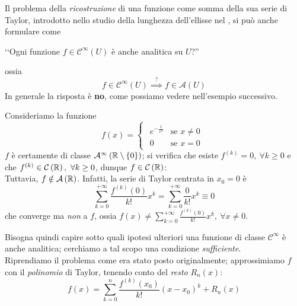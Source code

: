 Il problema della \textit{ricostruzione} di una funzione come somma della sua serie di Taylor, introdotto nello studio della lunghezza dell'ellisse nel , si può anche formulare come
\begin{center}
	‘‘Ogni funzione $f\in\mathcal{C}^{\infty}\left(U\right)$ è anche analitica su $U$?''
\end{center}
ossia
\begin{equation*}
	f\in\mathcal{C}^{\infty}\left(U\right)\stackrel{?}{\implies}f\in\mathcal{A}\left(U\right)
\end{equation*}
In generale la risposta è \textbf{no}, come possiamo vedere nell'esempio successivo.
\begin{example}
	Consideriamo la funzione
	\begin{equation*}
		f\left(x\right)=
		\begin{cases}
			\begin{array}{ll}
				e^{-\frac{1}{x^2}}&\text{se }x\neq 0\\
				0&\text{se }x=0
			\end{array}
		\end{cases}
	\end{equation*}
$f$ è certamente di classe $\mathcal{A}^{\infty}\left(\mathbb{R}\setminus\left\{0\right\}\right)$; si verifica che esiste $f^{\left(k\right)}=0,\ \forall k\geq 0$ e che $f^{\left(k\right)}\in\mathcal{C}\left(\realset\right),\ \forall k\geq 0$, dunque $f\in\mathcal{C}\left(\mathbb{R}\right)$:\\
Tuttavia, $f\notin\mathcal{A}\left(\mathbb{R}\right)$. Infatti, la serie di Taylor centrata in $x_0=0$ è
\begin{equation*}
	\sum_{k=0}^{+\infty}\frac{f^{\left(k\right)}\left(0\right)}{k!}x^k=\sum_{k=0}^{+\infty}\frac{0}{k!}x^k\equiv 0
\end{equation*}
che converge ma \textit{non} a $f$, ossia $f\left(x\right)\neq 	\sum_{k=0}^{+\infty}\frac{f^{\left(k\right)}\left(0\right)}{k!}x^k,\ \forall x\neq 0$.
\end{example}
Bisogna quindi capire sotto quali ipotesi ulteriori una funzione di classe $\mathcal{C}^{\infty}$ è anche analitica; cerchiamo a tal scopo una condizione \textit{sufficiente}.\\
Riprendiamo il problema come era stato posto originalmente; approssimiamo $f$ con il \textit{polinomio} di Taylor, tenendo conto del \textit{resto} $R_n\left(x\right)$:
\begin{equation*}
	f\left(x\right)=\sum_{k=0}^{n}\frac{f^{\left(k\right)}\left(x_0\right)}{k!}\left(x-x_0\right)^k+R_n\left(x\right)
\end{equation*}
